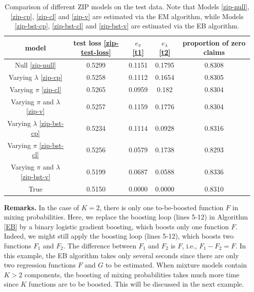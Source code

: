\documentclass[11pt]{article}
\numberwithin{equation}{section}
\begin{document}
\begin{table}[htp!]
	\caption{Comparison of different ZIP models on the test data. Note that Models \eqref{zip-null}, \eqref{zip-cp}, \eqref{zip-cl} and \eqref{zip-v} are estimated via the EM algorithm, while Models \eqref{zip-bst-cp}, \eqref{zip-bst-cl} and \eqref{zip-bst-v} are estimated via the EB algorithm.} \label{zip}
	\centering
	\begin{tabular}{ccccc}
		
		\hline\hline
		model   & test loss \eqref{zip-test-loss}  & $e_\pi$ \eqref{t1}& $e_\lambda$ \eqref{t2} & proportion of zero claims \\ \hline
		Null \eqref{zip-null}    & 0.5299 & 0.1151     & 0.1795     & 0.8308        \\
		Varying $\lambda$ \eqref{zip-cp} & 0.5258 & 0.1112     & 0.1654     & 0.8305        \\
		Varying $\pi$ \eqref{zip-cl} & 0.5265 & 0.0959     & 0.182      & 0.8304        \\
		Varying $\pi$ and $\lambda$  \eqref{zip-v} & 0.5257 & 0.1159     & 0.1776     & 0.8304        \\
		\hline
		Varying $\lambda$  \eqref{zip-bst-cp} & 0.5234 & 0.1114     & 0.0928     & 0.8316        \\
		Varying $\pi$   \eqref{zip-bst-cl} & 0.5256 & 0.0579     & 0.1738     & 0.8293        \\
		Varying $\pi$ and $\lambda$  \eqref{zip-bst-v}  & 0.5199 & 0.0687     & 0.0588     & 0.8336        \\
		\hline
		True    & 0.5150  & 0.0000         & 0.0000         & 0.8310         \\ \hline\hline
	\end{tabular}
\end{table}

{\bf Remarks.}
In the case of $K=2$, there is only one to-be-boosted function $F$ in mixing probabilities. 
Here, we replace the boosting loop (lines 5-12) in Algorithm \ref{EB} by a binary logistic gradient boosting,
which boosts only one function $F$.   
Indeed, we might still apply the boosting loop (lines 5-12), which boosts two functions $F_1$ and $F_2$. The difference between $F_1$ and $F_2$ is $F$, i.e., $F_1-F_2=F.$
In this example, the EB algorithm takes only several seconds since there are only two regression functions $F$ and $G$ to be estimated.
When mixture models contain $K>2$ components, the boosting of mixing probabilities takes much more time since $K$ functions are to be boosted. This will be discussed in the next example.
\end{document}
